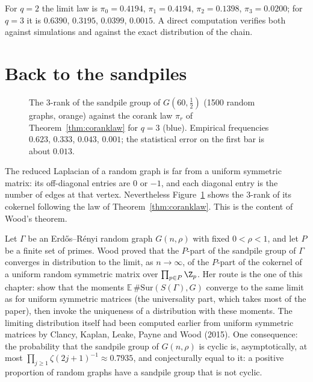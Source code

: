 For $q=2$ the limit law is $\pi_0=0.4194$, $\pi_1=0.4194$, $\pi_2=0.1398$, $\pi_3=0.0200$; for $q=3$ it is $0.6390$, $0.3195$, $0.0399$, $0.0015$. A direct computation verifies both against simulations and against the exact distribution of the chain.

\section{Back to the sandpiles}

\begin{figure}[ht]\centering{}
\caption{The $3$-rank of the sandpile group of $G(60,\frac12)$ (1500 random graphs, orange) against the corank law $\pi_r$ of Theorem~\ref{thm:coranklaw} for $q=3$ (blue). Empirical frequencies $0.623$, $0.333$, $0.043$, $0.001$; the statistical error on the first bar is about $0.013$.}
\label{fig:sandpile}
\end{figure}

The reduced Laplacian of a random graph is far from a uniform symmetric matrix: its off-diagonal entries are $0$ or $-1$, and each diagonal entry is the number of edges at that vertex. Nevertheless Figure~\ref{fig:sandpile} shows the $3$-rank of its cokernel following the law of Theorem~\ref{thm:coranklaw}. This is the content of Wood's theorem.

\begin{remark}\label{rem:woodsandpile}
Let $\Gamma$ be an Erd\H os--R\'enyi random graph $G(n,\rho)$ with fixed $0<\rho<1$, and let $P$ be a finite set of primes. Wood proved that the $P$-part of the sandpile group of $\Gamma$ converges in distribution to the limit, as $n\to\infty$, of the $P$-part of the cokernel of a uniform random symmetric matrix over $\prod_{p\in P}\Z_p$. Her route is the one of this chapter: show that the moments $\mathbb E\,\#\mathrm{Sur}(S(\Gamma),G)$ converge to the same limit as for uniform symmetric matrices (the universality part, which takes most of the paper), then invoke the uniqueness of a distribution with these moments. The limiting distribution itself had been computed earlier from uniform symmetric matrices by Clancy, Kaplan, Leake, Payne and Wood (2015). One consequence: the probability that the sandpile group of $G(n,\rho)$ is cyclic is, asymptotically, at most $\prod_{j\ge1}\zeta(2j+1)^{-1}\approx0.7935$, and conjecturally equal to it: a positive proportion of random graphs have a sandpile group that is not cyclic.
\end{remark}

